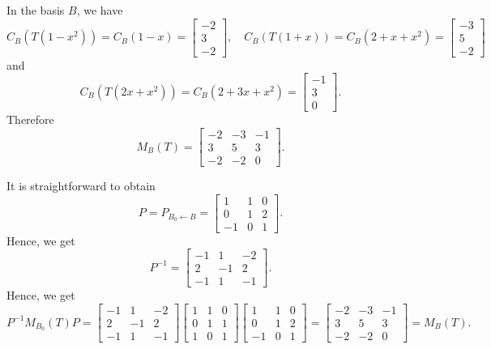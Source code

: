 \documentclass[12pt]{article}
\begin{document}
In the basis $B$, we have
	\[
		C_{B} (T (1 - x^2)) = C_{B} (1 - x ) = \begin{bmatrix} -2 \\ 3 \\ -2 \end{bmatrix} , \quad C_B (T (1 + x)) = C_B (2 + x + x^2) = \begin{bmatrix} -3 \\ 5 \\ -2 \end{bmatrix}
	\]
and
	\[
		C_B (T (2x + x^2)) = C_B (2 + 3x + x^2 ) = \begin{bmatrix} -1 \\ 3 \\ 0 \end{bmatrix} .
	\]
Therefore
	\[
		M_B (T) = \begin{bmatrix} -2 & -3 & -1 \\ 3 & 5 & 3 \\ -2 & -2 & 0 \end{bmatrix} .
	\]

It is straightforward to obtain
	\[
		P = P_{B_0 \leftarrow B} = \begin{bmatrix} 1 & 1 & 0\\ 0 & 1 & 2 \\ -1 & 0 & 1 \end{bmatrix} .
	\]
Hence, we get
	\[
		P^{-1} = \begin{bmatrix} -1 & 1 & -2\\2 & -1 & 2\\-1 & 1 & -1 \end{bmatrix} .
	\]
Hence, we get
	\[
		P^{-1} M_{B_0} (T) P = \begin{bmatrix} -1 & 1 & -2\\2 & -1 & 2\\-1 & 1 & -1 \end{bmatrix}  \begin{bmatrix} 1 & 1 & 0 \\ 0 & 1 & 1 \\ 1 & 0 & 1 \end{bmatrix} \begin{bmatrix} 1 & 1 & 0\\ 0 & 1 & 2 \\ -1 & 0 & 1 \end{bmatrix} = \begin{bmatrix} -2 & -3 & -1\\3 & 5 & 3\\-2 & -2 & 0 \end{bmatrix} = M_B (T) .
	\]
\end{document}
